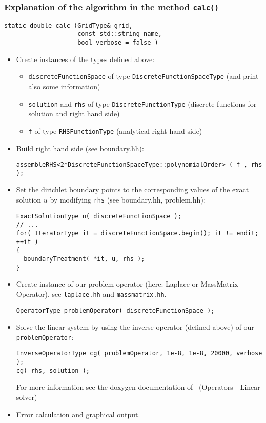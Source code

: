 \subsubsection*{ Explanation of the algorithm in the method \texttt{calc()} }
\begin{lstlisting}
static double calc (GridType& grid,
                    const std::string name,
                    bool verbose = false )
\end{lstlisting}

\begin{itemize}
 \item Create instances of the types defined above:
	\begin{itemize}
	  \item \texttt{discreteFunctionSpace} of type \texttt{DiscreteFunctionSpaceType} (and print also some information)
	  \item \texttt{solution} and \texttt{rhs} of type \texttt{DiscreteFunctionType} (discrete functions for solution and right hand side)
	  \item \texttt{f} of type \texttt{RHSFunctionType} (analytical right hand side)
	\end{itemize}

 \item Build right hand side (see boundary.hh):
\begin{lstlisting}
assembleRHS<2*DiscreteFunctionSpaceType::polynomialOrder> ( f , rhs );
\end{lstlisting}

 \item Set the dirichlet boundary points to the corresponding values of the exact solution $u$ by modifying \texttt{rhs}
       (see boundary.hh, problem.hh):
\begin{lstlisting}
ExactSolutionType u( discreteFunctionSpace );
// ...
for( IteratorType it = discreteFunctionSpace.begin(); it != endit; ++it )
{
  boundaryTreatment( *it, u, rhs );
}
\end{lstlisting}

 \item Create instance of our problem operator (here: Laplace or MassMatrix Operator),
       see \texttt{laplace.hh} and \texttt{massmatrix.hh}.
\begin{lstlisting}
OperatorType problemOperator( discreteFunctionSpace );
\end{lstlisting}

 \item Solve the linear system by using the inverse operator (defined above) of our \texttt{problemOperator}:
\begin{lstlisting}
InverseOperatorType cg( problemOperator, 1e-8, 1e-8, 20000, verbose );
cg( rhs, solution );
\end{lstlisting}
For more information see the doxygen documentation of \Fem\ (Operators - Linear solver)

 \item Error calculation and graphical output.
\end{itemize}




